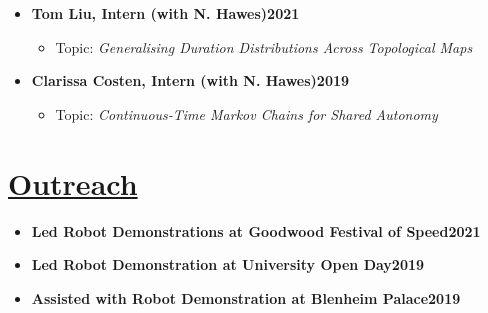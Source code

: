 \documentclass[11pt]{article}
\begin{document}
\begin{itemize}
\begin{itemize}
\end{itemize}
\item \textbf{Tom Liu, Intern (with N. Hawes)\hfill 2021}
\begin{itemize}
\item Topic: \emph{Generalising Duration Distributions Across Topological Maps}
\end{itemize}
\item \textbf{Clarissa Costen, Intern (with N. Hawes)\hfill 2019}
\begin{itemize}
\item Topic: \emph{Continuous-Time Markov Chains for Shared Autonomy}
\end{itemize}
\end{itemize}

\vspace{-10pt}
\section*{\uline{Outreach\hfill}}
\vspace{-5pt}
\begin{itemize}
\item \textbf{Led Robot Demonstrations at Goodwood Festival of Speed\hfill 2021}
\item \textbf{Led Robot Demonstration at University Open Day\hfill 2019}
\item \textbf{Assisted with Robot Demonstration at Blenheim Palace\hfill 2019}
\end{itemize}



\vspace{-10pt}
\end{document}
